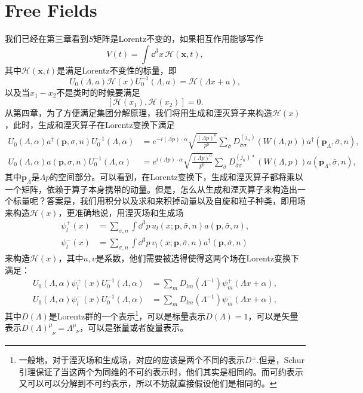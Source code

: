 \documentclass[10pt]{extbook}
\theoremstyle{plain}%
\begin{document}
\section{Free Fields}
我们已经在第三章看到$S$矩阵是Lorentz不变的，如果相互作用能够写作
\[
	V(t)=\int \dd^3 x\,\mathscr{H}(\mathbf{x},t),
\]
其中$\mathscr{H}(\mathbf{x},t)$是满足Lorentz不变性的标量，即
\[
	U_0(\Lambda,a)\mathscr{H}(x)U_0^{-1}(\Lambda,a)=\mathscr{H}(\Lambda x+a),
\]
以及当$x_1-x_2$不是类时的时候要满足
\[
	[\mathscr{H}(x_1),\mathscr{H}(x_2)]=0.
\]
从第四章，为了方便满足集团分解原理，我们将用生成和湮灭算子来构造$\mathscr{H}(x)$，此时，生成和湮灭算子在Lorentz变换下满足
\[
\begin{split}
	U_0(\Lambda,\alpha)a^\dag(\mathbf{p},\sigma,n)U_0^{-1}(\Lambda,\alpha)&=e^{-i(\Lambda p)\cdot \alpha}\sqrt{\frac{(\Lambda p)^0}{p^0}}\sum_{\bar{\sigma}} D^{(j_n)}_{\bar{\sigma}\sigma}\left(W(\Lambda,p)\right)a^\dag(\mathbf{p}_\Lambda,\bar{\sigma},n),\\
	U_0(\Lambda,\alpha)a(\mathbf{p},\sigma,n)U_0^{-1}(\Lambda,\alpha)&=e^{i(\Lambda p)\cdot \alpha}\sqrt{\frac{(\Lambda p)^0}{p^0}}\sum_{\bar{\sigma}} D^{(j_n)*}_{\bar{\sigma}\sigma}\left(W(\Lambda,p)\right)a(\mathbf{p}_\Lambda,\bar{\sigma},n),
\end{split}
\]
其中$\mathbf{p}_\Lambda$是$\Lambda p$的空间部分。可以看到，在Lorentz变换下，生成和湮灭算子都将乘以一个矩阵，依赖于算子本身携带的动量。但是，怎么从生成和湮灭算子来构造出一个标量呢？答案是，我们用积分以及求和来积掉动量以及自旋和粒子种类，即用场来构造$\mathscr{H}(x)$，更准确地说，用湮灭场和生成场
\begin{equation}
\begin{split}
	\psi_l^{+}(x)&=\sum_{\sigma,n}\int \dd^3 p\, u_l(x;\mathbf{p},\bar{\sigma},n)a(\mathbf{p},\bar{\sigma},n),\\
	\psi_l^{-}(x)&=\sum_{\sigma,n}\int \dd^3 p\, v_l(x;\mathbf{p},\bar{\sigma},n)a^\dag(\mathbf{p},\bar{\sigma},n)
\end{split}
\label{chang}
\end{equation}
来构造$\mathscr{H}(x)$，其中$u,v$是系数，他们需要被选得使得这两个场在Lorentz变换下满足：
\[
\begin{split}
	U_0(\Lambda,\alpha)\psi_l^{+}(x)U_0^{-1}(\Lambda,\alpha)&=\sum_{m}D_{lm}(\Lambda^{-1})\psi_m^{+}(\Lambda x+\alpha),\\
	U_0(\Lambda,\alpha)\psi_l^{-}(x)U_0^{-1}(\Lambda,\alpha)&=\sum_{m}D_{lm}(\Lambda^{-1})\psi_m^{-}(\Lambda x+\alpha),
\end{split}
\]
其中$D(\Lambda)$是Lorentz群的一个表示\footnote{一般地，对于湮灭场和生成场，对应的应该是两个不同的表示$D^\pm$.但是，Schur引理保证了当这两个为同维的不可约表示时，他们其实是相同的。而可约表示又可以可以分解到不可约表示，所以不妨就直接假设他们是相同的。}，可以是标量表示$D(\Lambda)=1$，可以是矢量表示$D(\Lambda)^{\mu}_{\phantom{\mu}\nu}=\Lambda^{\mu}_{\phantom{\mu}\nu}$，可以是张量或者旋量表示。
\end{document}
